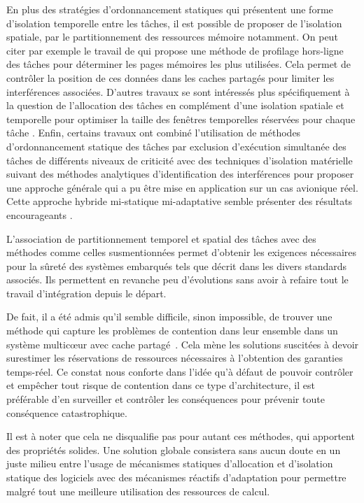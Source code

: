 \documentclass[french, a4paper, 11pt, twoside, pdftex]{StyleThese}
\begin{document}
	En plus des stratégies d'ordonnancement statiques qui présentent une forme d'isolation temporelle entre les tâches, il est possible de proposer de l'isolation spatiale, par le partitionnement des ressources mémoire notamment. On peut citer par exemple le travail de \cite{mancuso_real-time_2013} qui propose une méthode de profilage hors-ligne des tâches pour déterminer les pages mémoires les plus utilisées. Cela permet de contrôler la position de ces données dans les caches partagés pour limiter les interférences associées. D'autres travaux se sont intéressés plus spécifiquement à la question de l'allocation des tâches en complément d'une isolation spatiale et temporelle pour optimiser la taille des fenêtres temporelles réservées pour chaque tâche \cite{tamas-selicean_task_2011}. Enfin, certains travaux ont combiné l'utilisation de méthodes d'ordonnancement statique des tâches par exclusion d'exécution simultanée des tâches de différents niveaux de criticité avec des techniques d'isolation matérielle suivant des méthodes analytiques d'identification des interférences pour proposer une approche générale qui a pu être mise en application sur un cas avionique réel. Cette approche hybride mi-statique mi-adaptative semble présenter des résultats encourageants \cite{giannopoulou_scheduling_2013}.
	
	L'association de partitionnement temporel et spatial des tâches avec des méthodes comme celles susmentionnées permet d'obtenir les exigences nécessaires pour la sûreté des systèmes embarqués tels que décrit dans les divers standards associés. Ils permettent en revanche peu d'évolutions sans avoir à refaire tout le travail d'intégration depuis le départ. 
	
	De fait, il a été admis qu'il semble difficile, sinon impossible, de trouver une méthode qui capture les problèmes de contention dans leur ensemble dans un système multicœur avec cache partagé~\cite{suhendra_exploring_2008}. Cela mène les solutions suscitées à devoir surestimer les réservations de ressources nécessaires à l'obtention des garanties temps-réel. Ce constat nous conforte dans l'idée qu'à défaut de pouvoir contrôler et empêcher tout risque de contention dans ce type d'architecture, il est préférable d'en surveiller et contrôler les conséquences pour prévenir toute conséquence catastrophique.
	
	Il est à noter que cela ne disqualifie pas pour autant ces méthodes, qui apportent des propriétés solides. Une solution globale consistera sans aucun doute en un juste milieu entre l'usage de mécanismes statiques d'allocation et d'isolation statique des logiciels avec des mécanismes réactifs d'adaptation pour permettre malgré tout une meilleure utilisation des ressources de calcul.
	
\end{document}
